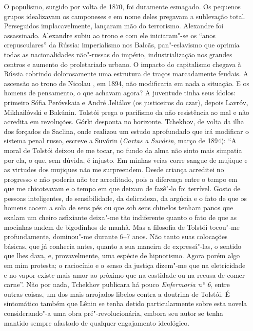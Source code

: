 O populismo, surgido por volta de 1870, foi duramente esmagado. Os
pequenos grupos idealizavam os camponeses e em nome deles pregavam a
sublevação total. Perseguidos implacavelmente, lançaram mão do
terrorismo. Alexandre  foi assassinado. Alexandre  subiu ao trono e
com ele iniciaram"-se os ``anos crepusculares'' da Rússia: imperialismo
nos Balcãs, pan"-eslavismo que oprimia todas as nacionalidades não"-russas
do império, industrialização nos grandes centros e aumento do
proletariado urbano. O impacto do capitalismo chegava à Rússia cobrindo
dolorosamente uma estrutura de traços marcadamente feudais. A ascensão
ao trono de Nicolau , em 1894, não modificaria em nada a situação. E os
homens de pensamento, o que achavam agora? A juventude tinha seus ídolos:
primeiro Sófia Peróvskaia e André Jeliálov (os justiceiros do czar),
depois Lavróv, Mikhailóvski e Bakúnin. Tolstói prega o pacifismo da não
resistência ao mal e não acredita em revoluções. Górki desponta no
horizonte. Tchekhov, de volta da ilha dos forçados de Saclina, onde realizou um
estudo aprofundado que irá modificar o sistema penal russo, escreve
a Suvórin (\emph{Cartas a Suvórin}, março de 1894): ``A moral de Tolstói deixou de me
tocar, no fundo da alma não sinto mais simpatia por ela, o que, sem
dúvida, é injusto. Em minhas veias corre sangue de mujique e as virtudes
dos mujiques não me surpreendem. Desde criança acreditei no progresso e
não poderia não ter acreditado, pois a diferença entre o tempo em que me
chicoteavam e o tempo em que deixam de fazê"-lo foi terrível. Gosto de
pessoas inteligentes, de sensibilidade, da delicadeza, da argúcia e o
fato de que os homens cocem a sola de seus pés ou que sob seus chinelos
tenham panos que exalam um cheiro asfixiante deixa"-me tão indiferente
quanto o fato de que as mocinhas andem de bigodinhos de manhã. Mas a
filosofia de Tolstói tocou"-me profundamente, dominou"-me durante 6--7
anos. Não tanto suas colocações básicas, que já conhecia antes, quanto a
sua maneira de expressá"-las, o sentido que lhes dava, e, provavelmente,
uma espécie de hipnotismo. Agora porém algo em mim protesta; o
raciocínio e o senso da justiça dizem"-me que na eletricidade e no vapor
existe mais amor ao próximo que na castidade ou na recusa de comer
carne''. Não por nada, Tchekhov publicara há pouco \emph{Enfermaria nº
6}, entre outras coisas, um dos mais arrojados libelos contra a doutrina
de Tolstói. É sintomático também que Lênin se tenha detido
particularmente sobre esta novela considerando"-a uma obra
pré"-revolucionária, embora seu autor se tenha mantido sempre afastado de
qualquer engajamento ideológico.

